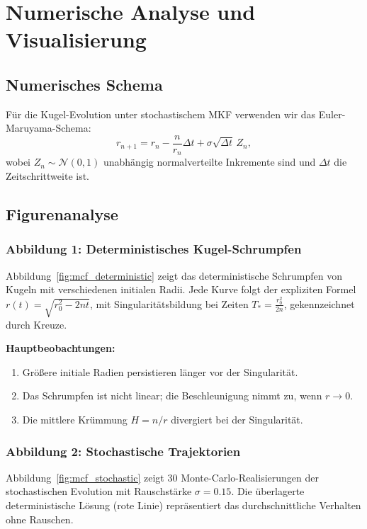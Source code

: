 \documentclass[a4paper,12pt]{article}
\theoremstyle{definition}
\begin{document}
\section{Numerische Analyse und Visualisierung}
\label{sec:numerics}

\subsection{Numerisches Schema}

Für die Kugel-Evolution unter stochastischem MKF verwenden wir das Euler-Maruyama-Schema:
\[
r_{n+1} = r_n - \frac{n}{r_n} \Delta t + \sigma \sqrt{\Delta t} \, Z_n,
\]
wobei $Z_n \sim \mathcal{N}(0,1)$ unabhängig normalverteilte Inkremente sind und $\Delta t$ die Zeitschrittweite ist.

\subsection{Figurenanalyse}

\subsubsection{Abbildung 1: Deterministisches Kugel-Schrumpfen}

Abbildung~\ref{fig:mcf_deterministic} zeigt das deterministische Schrumpfen von Kugeln mit verschiedenen initialen Radii. Jede Kurve folgt der expliziten Formel $r(t) = \sqrt{r_0^2 - 2nt}$, mit Singularitätsbildung bei Zeiten $T_* = \frac{r_0^2}{2n}$, gekennzeichnet durch Kreuze.

\textbf{Hauptbeobachtungen:}
\begin{enumerate}
	\item Größere initiale Radien persistieren länger vor der Singularität.
	\item Das Schrumpfen ist nicht linear; die Beschleunigung nimmt zu, wenn $r \to 0$.
	\item Die mittlere Krümmung $H = n/r$ divergiert bei der Singularität.
\end{enumerate}

\subsubsection{Abbildung 2: Stochastische Trajektorien}

Abbildung~\ref{fig:mcf_stochastic} zeigt 30 Monte-Carlo-Realisierungen der stochastischen Evolution mit Rauschstärke $\sigma = 0.15$. Die überlagerte deterministische Lösung (rote Linie) repräsentiert das durchschnittliche Verhalten ohne Rauschen.
\end{document}
